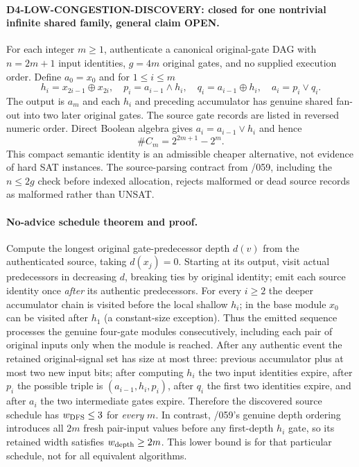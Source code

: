 \documentclass[11pt]{article}
\begin{document}
\paragraph{D4-LOW-CONGESTION-DISCOVERY: closed for one nontrivial infinite shared family, general claim OPEN.}
For each integer $m\geq1$, authenticate a canonical original-gate DAG with
$n=2m+1$ input identities, $g=4m$ original gates, and no supplied
execution order. Define $a_0=x_0$ and for $1\leq i\leq m$
\[
h_i=x_{2i-1}\oplus x_{2i},\quad
p_i=a_{i-1}\wedge h_i,\quad
q_i=a_{i-1}\oplus h_i,\quad
a_i=p_i\vee q_i .
\]
The output is $a_m$ and each $h_i$ and preceding accumulator has genuine
shared fan-out into two later original gates. The source gate records are
listed in reversed numeric order. Direct Boolean algebra gives
$a_i=a_{i-1}\vee h_i$ and hence
\[
\#C_m=2^{2m+1}-2^m.
\]
This compact semantic identity is an admissible cheaper alternative,
not evidence of hard SAT instances. The source-parsing contract
from /059, including the $n\leq2g$ check before indexed allocation,
rejects malformed or dead source records as malformed rather than UNSAT.

\paragraph{No-advice schedule theorem and proof.}
Compute the longest original gate-predecessor depth $d(v)$ from the
authenticated source, taking $d(x_j)=0$. Starting at its output, visit
actual predecessors in decreasing $d$, breaking ties by original
identity; emit each source identity once \emph{after} its authentic
predecessors. For every $i\geq2$ the deeper accumulator chain is visited
before the local shallow $h_i$; in the base module $x_0$ can be
visited after $h_1$ (a constant-size exception).
Thus the emitted sequence processes
the genuine four-gate modules consecutively, including each pair of
original inputs only when the module is reached.
After any authentic event the retained original-signal set has size
at most three: previous accumulator plus at most two new input bits;
after computing $h_i$ the two input identities expire, after
$p_i$ the possible triple is $(a_{i-1},h_i,p_i)$, after $q_i$
the first two identities expire, and after $a_i$ the two
intermediate gates expire. Therefore the discovered source schedule
has $w_{\rm DFS}\leq3$ for \emph{every} $m$.
In contrast, /059's genuine depth ordering introduces all $2m$
fresh pair-input values before any first-depth $h_i$ gate, so its
retained width satisfies $w_{\rm depth}\geq2m$. This lower bound
is for that particular schedule, not for all equivalent algorithms.
\end{document}

